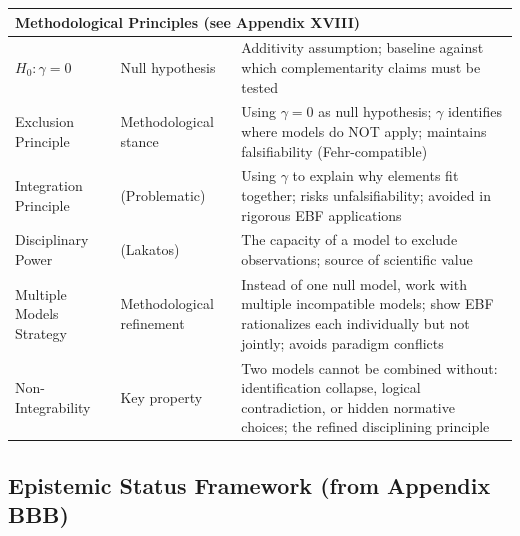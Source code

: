 \begin{center}
\begin{longtable}{@{}lp{3cm}p{8cm}@{}}
\multicolumn{3}{l}{\textbf{Methodological Principles (see Appendix XVIII)}} \\
\midrule
$H_0: \gamma = 0$ & Null hypothesis & Additivity assumption; baseline against which complementarity claims must be tested \\
Exclusion Principle & Methodological stance & Using $\gamma = 0$ as null hypothesis; $\gamma$ identifies where models do NOT apply; maintains falsifiability (Fehr-compatible) \\
Integration Principle & (Problematic) & Using $\gamma$ to explain why elements fit together; risks unfalsifiability; avoided in rigorous EBF applications \\
Disciplinary Power & (Lakatos) & The capacity of a model to exclude observations; source of scientific value \\
Multiple Models Strategy & Methodological refinement & Instead of one null model, work with multiple incompatible models; show EBF rationalizes each individually but not jointly; avoids paradigm conflicts \\
Non-Integrability & Key property & Two models cannot be combined without: identification collapse, logical contradiction, or hidden normative choices; the refined disciplining principle \\
\bottomrule
\end{longtable}
\end{center}

\subsection{Epistemic Status Framework (from Appendix BBB)}
\label{sec:glossary-epistemic}

